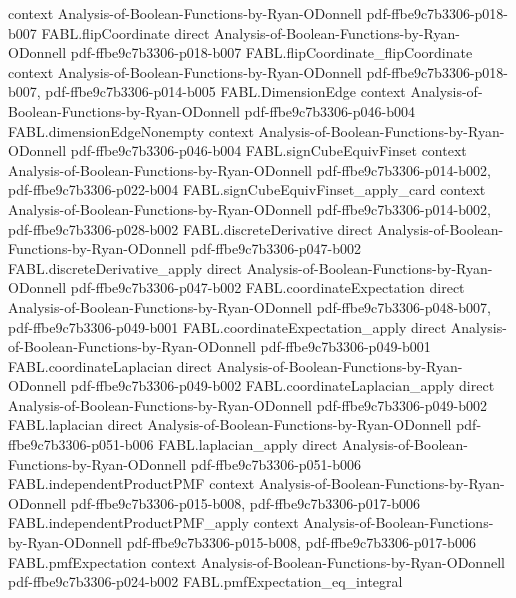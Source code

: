 \begin{theorem}
  {context}
  {Analysis-of-Boolean-Functions-by-Ryan-ODonnell}
  {pdf-ffbe9c7b3306-p018-b007}
\proofstep
  {FABL.flipCoordinate}
  {direct}
  {Analysis-of-Boolean-Functions-by-Ryan-ODonnell}
  {pdf-ffbe9c7b3306-p018-b007}
\proofstep
  {FABL.flipCoordinate_flipCoordinate}
  {context}
  {Analysis-of-Boolean-Functions-by-Ryan-ODonnell}
  {pdf-ffbe9c7b3306-p018-b007,
    pdf-ffbe9c7b3306-p014-b005}
\proofstep
  {FABL.DimensionEdge}
  {context}
  {Analysis-of-Boolean-Functions-by-Ryan-ODonnell}
  {pdf-ffbe9c7b3306-p046-b004}
\proofstep
  {FABL.dimensionEdgeNonempty}
  {context}
  {Analysis-of-Boolean-Functions-by-Ryan-ODonnell}
  {pdf-ffbe9c7b3306-p046-b004}
\proofstep
  {FABL.signCubeEquivFinset}
  {context}
  {Analysis-of-Boolean-Functions-by-Ryan-ODonnell}
  {pdf-ffbe9c7b3306-p014-b002,
    pdf-ffbe9c7b3306-p022-b004}
\proofstep
  {FABL.signCubeEquivFinset_apply_card}
  {context}
  {Analysis-of-Boolean-Functions-by-Ryan-ODonnell}
  {pdf-ffbe9c7b3306-p014-b002,
    pdf-ffbe9c7b3306-p028-b002}
\proofstep
  {FABL.discreteDerivative}
  {direct}
  {Analysis-of-Boolean-Functions-by-Ryan-ODonnell}
  {pdf-ffbe9c7b3306-p047-b002}
\proofstep
  {FABL.discreteDerivative_apply}
  {direct}
  {Analysis-of-Boolean-Functions-by-Ryan-ODonnell}
  {pdf-ffbe9c7b3306-p047-b002}
\proofstep
  {FABL.coordinateExpectation}
  {direct}
  {Analysis-of-Boolean-Functions-by-Ryan-ODonnell}
  {pdf-ffbe9c7b3306-p048-b007,
    pdf-ffbe9c7b3306-p049-b001}
\proofstep
  {FABL.coordinateExpectation_apply}
  {direct}
  {Analysis-of-Boolean-Functions-by-Ryan-ODonnell}
  {pdf-ffbe9c7b3306-p049-b001}
\proofstep
  {FABL.coordinateLaplacian}
  {direct}
  {Analysis-of-Boolean-Functions-by-Ryan-ODonnell}
  {pdf-ffbe9c7b3306-p049-b002}
\proofstep
  {FABL.coordinateLaplacian_apply}
  {direct}
  {Analysis-of-Boolean-Functions-by-Ryan-ODonnell}
  {pdf-ffbe9c7b3306-p049-b002}
\proofstep
  {FABL.laplacian}
  {direct}
  {Analysis-of-Boolean-Functions-by-Ryan-ODonnell}
  {pdf-ffbe9c7b3306-p051-b006}
\proofstep
  {FABL.laplacian_apply}
  {direct}
  {Analysis-of-Boolean-Functions-by-Ryan-ODonnell}
  {pdf-ffbe9c7b3306-p051-b006}
\proofstep
  {FABL.independentProductPMF}
  {context}
  {Analysis-of-Boolean-Functions-by-Ryan-ODonnell}
  {pdf-ffbe9c7b3306-p015-b008,
    pdf-ffbe9c7b3306-p017-b006}
\proofstep
  {FABL.independentProductPMF_apply}
  {context}
  {Analysis-of-Boolean-Functions-by-Ryan-ODonnell}
  {pdf-ffbe9c7b3306-p015-b008,
    pdf-ffbe9c7b3306-p017-b006}
\proofstep
  {FABL.pmfExpectation}
  {context}
  {Analysis-of-Boolean-Functions-by-Ryan-ODonnell}
  {pdf-ffbe9c7b3306-p024-b002}
\proofstep
  {FABL.pmfExpectation_eq_integral}

\end{theorem}
